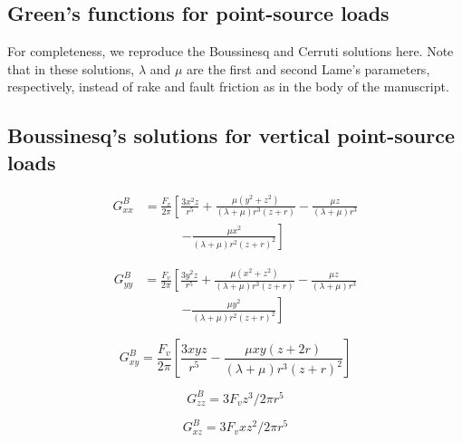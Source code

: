 \documentclass[draft,jgrga]{AGUTeX}
\begin{document}
\begin{article}
\appendix

\section{Green's functions for point-source
loads}\label{greens-functions-for-point-source-loads} For
completeness, we reproduce the Boussinesq
\citep[e.g.,][]{jeffreys1970} and Cerruti \citep[e.g.,][]{love1927}
solutions here.  Note that in these solutions, $\lambda$ and $\mu$ are
the first and second Lame's parameters, respectively, instead of rake
and fault friction as in the body of the manuscript.

\subsection{Boussinesq's solutions for vertical point-source
loads}\label{boussinesqs-solutions-for-vertical-point-source-loads}

\begin{equation}
\begin{split}
G_{xx}^B & = \frac{ F_v }{ 2\pi } \left[ \frac{ 3x^2 z}{ r^5 } \right.
+ \frac{\mu (y^2 + z^2)}{(\lambda + \mu) r^3 (z + r)}
- \frac{\mu z}{(\lambda + \mu) r^3} \\
&\qquad \quad \left. - \frac{\mu x^2}{ (\lambda + \mu) r^2 (z + r)^2 }\right ]
\end{split}
\end{equation}

\begin{equation}
\begin{split}
G_{yy}^B & = \frac{F_v}{2\pi } \left [ \frac{3y^2 z}{r^5} \right.
+ \frac{\mu (x^{2} + z^{2})}{(\lambda + \mu) r^{3}(z + r)}
- \frac{\mu z}{(\lambda + \mu) r ^{3}} \\
& \qquad \quad \left. - \frac{\mu y^{2}}{(\lambda + \mu ) r^2 (z +r)^2} \right]
\end{split}
\end{equation}

\begin{equation}
G_{xy}^{B} = \frac{F _{v}}{2\pi} \left[ \frac{3xyz}{r^{5}}
- \frac{\mu x y (z + 2r)}{(\lambda + \mu) r^{3} (z + r)^{2}} \right]
\end{equation}

\begin{equation}
G_{zz}^{B} = 3 F _{v} z^{3} / 2 \pi r^{5}
\end{equation}

\begin{equation}
G_{xz}^{B} = 3 F _{v} xz^{2} / 2 \pi r^{5}
\end{equation}


\end{article}
\end{document}
